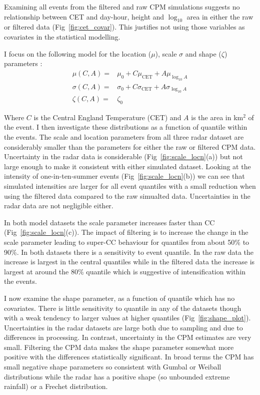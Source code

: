 \documentclass[11pt,a4paper]{article}
\begin{document}
Examining all events from the filtered and raw CPM simulations suggests no relationship between CET and day-hour, height and $\log_{10}$ area in either the raw or filtered data (Fig~\ref{fig:cet_covar}). This justifies not using those variables as covariates in the statistical modelling. 

I focus on the following  model for the location ($\mu$), scale $\sigma$ and shape ($\zeta$) parameters :
\begin{align}
	\mu(C,A) =& \mu_0 + C\mu_\text{CET}+A\mu_{\log_{10}A} \\
	 \sigma(C,A) =& \sigma_0 +C\sigma_\text{CET}+A\sigma_{\log_{10}A}\\
	 \zeta(C,A)=&\zeta_0
\end{align}

Where $C$ is the Central England Temperature (CET) and $A$ is the area in km$^2$ of the event.  I then investigate these distributions as a function of quantile within the events.  The scale and location parameters from all three radar dataset are considerably smaller than the parameters for either the raw or filtered CPM data. Uncertainty in the radar data is considerable (Fig~\ref{fig:scale_locn}(a)) but not large enough to make it consistent with either simulated dataset.  Looking at the intensity of one-in-ten-summer events (Fig~\ref{fig:scale_locn}(b)) we can see that simulated intensities are larger for all event quantiles with a small reduction when using the filtered data compared to the raw simualted data. Uncertainties in the radar data are not  negligible either. 

In both model datasets the scale parameter increases faster than CC (Fig~\ref{fig:scale_locn}(c)). The impact of filtering is to increase the change in the scale parameter leading to super-CC behaviour for quantiles from about 50\% to 90\%.  In both datasets there is a sensitivity to event quantile. In the raw data the increase is largest in the central quantiles while in the filtered data the increase is largest at around the 80\% quantile which is suggestive of intensification within the events. 

I now examine the shape parameter, as a function of quantile which  has no covariates.  There is little sensitivity to quantile in any of the datasets though with a weak tendency to larger values at higher quantiles (Fig~\ref{fig:shape_plot}).  Uncertainties in the radar datasets are large both due to sampling and due to differences in processing. In contrast, uncertainty in the CPM estimates are very small. Filtering the CPM data makes the shape parameter somewhat more positive with the differences statistically significant. In broad terms the CPM has small negative  shape parameters so consistent with Gumbal or Weiball distributions while the radar has a positive shape (so unbounded extreme rainfall)  or a Frechet distribution. 
\end{document}

